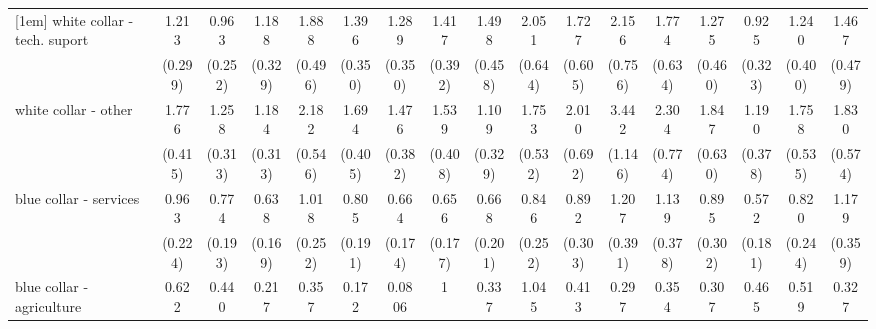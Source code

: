 {\begin{tabular}{l*{16}{c}}
[1em]
white collar - tech. suport&       1.213         &       0.963         &       1.188         &       1.888\sym{*}  &       1.396         &       1.289         &       1.417         &       1.498         &       2.051\sym{*}  &       1.727         &       2.156\sym{*}  &       1.774         &       1.275         &       0.925         &       1.240         &       1.467         \\
                    &     (0.299)         &     (0.252)         &     (0.329)         &     (0.496)         &     (0.350)         &     (0.350)         &     (0.392)         &     (0.458)         &     (0.644)         &     (0.605)         &     (0.756)         &     (0.634)         &     (0.460)         &     (0.323)         &     (0.400)         &     (0.479)         \\
[1em]
white collar - other&       1.776\sym{*}  &       1.258         &       1.184         &       2.182\sym{**} &       1.694\sym{*}  &       1.476         &       1.539         &       1.109         &       1.753         &       2.010\sym{*}  &       3.442\sym{***}&       2.304\sym{*}  &       1.847         &       1.190         &       1.758         &       1.830         \\
                    &     (0.415)         &     (0.313)         &     (0.313)         &     (0.546)         &     (0.405)         &     (0.382)         &     (0.408)         &     (0.329)         &     (0.532)         &     (0.692)         &     (1.146)         &     (0.774)         &     (0.630)         &     (0.378)         &     (0.535)         &     (0.574)         \\
[1em]
blue collar - services&       0.963         &       0.774         &       0.638         &       1.018         &       0.805         &       0.664         &       0.656         &       0.668         &       0.846         &       0.892         &       1.207         &       1.139         &       0.895         &       0.572         &       0.820         &       1.179         \\
                    &     (0.224)         &     (0.193)         &     (0.169)         &     (0.252)         &     (0.191)         &     (0.174)         &     (0.177)         &     (0.201)         &     (0.252)         &     (0.303)         &     (0.391)         &     (0.378)         &     (0.302)         &     (0.181)         &     (0.244)         &     (0.359)         \\
[1em]
blue collar - agriculture&       0.622         &       0.440         &       0.217\sym{*}  &       0.357         &       0.172\sym{*}  &      0.0806\sym{*}  &           1         &       0.337         &       1.045         &       0.413         &       0.297         &       0.354         &       0.307         &       0.465         &       0.519         &       0.327         \\

\end{tabular}}
